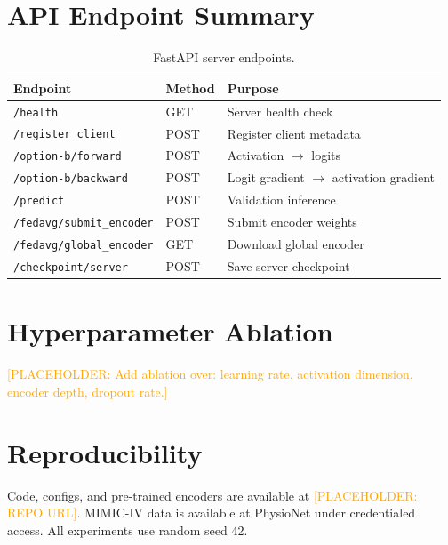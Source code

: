 \documentclass[10pt,twocolumn]{article}
\newcommand{\placeholder}[1]{\textcolor{orange}{[PLACEHOLDER: #1]}}
\begin{document}
\appendix

\section{API Endpoint Summary}
\label{app:api}

\begin{table}[h]
\centering
\caption{FastAPI server endpoints.}
\begin{tabular}{llp{4cm}}
\toprule
Endpoint & Method & Purpose \\
\midrule
\texttt{/health}                  & GET  & Server health check \\
\texttt{/register\_client}         & POST & Register client metadata \\
\texttt{/option-b/forward}        & POST & Activation $\to$ logits \\
\texttt{/option-b/backward}       & POST & Logit gradient $\to$ activation gradient \\
\texttt{/predict}                 & POST & Validation inference \\
\texttt{/fedavg/submit\_encoder}   & POST & Submit encoder weights \\
\texttt{/fedavg/global\_encoder}   & GET  & Download global encoder \\
\texttt{/checkpoint/server}       & POST & Save server checkpoint \\
\bottomrule
\end{tabular}
\end{table}

\section{Hyperparameter Ablation}
\label{app:ablation}

\placeholder{Add ablation over: learning rate, activation dimension,
encoder depth, dropout rate.}

\section{Reproducibility}
\label{app:repro}

Code, configs, and pre-trained encoders are available at
\placeholder{REPO URL}.  MIMIC-IV data is available at PhysioNet
under credentialed access.  All experiments use random seed 42.
\end{document}
